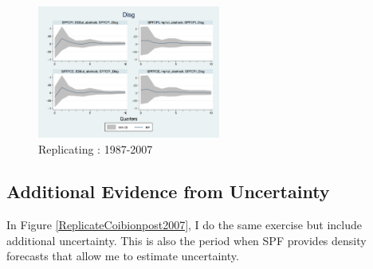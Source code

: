 \documentclass[]{article}
\begin{document}
\begin{figure}[ht]
		\includegraphics[width=6cm]{figures/SPFDisg_ab_ashocks.png} 
	\caption{ Replicating \citet{coibion2012can}: 1987-2007}
	\label{ReplicateCoibionBefore2007}
\end{figure}




\subsection{Additional Evidence from Uncertainty}



In Figure \ref{ReplicateCoibionpost2007}, I do the same exercise but include additional uncertainty. This is also the period when SPF provides density forecasts that allow me to estimate uncertainty. 
\end{document}
